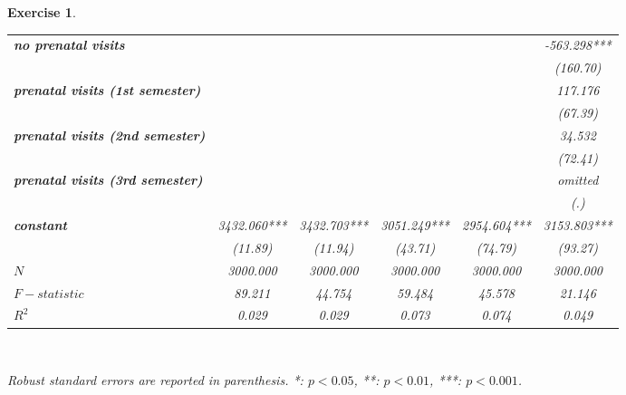 \documentclass{article}
\newtheorem{exercise}[theorem]{Exercise}
\begin{document}
\begin{exercise}
\begin{table}[hp!]
\begin{adjustbox}{width=1.2\textwidth}
\begin{tabular}{l|ccccc|}
\multicolumn{1}{|l|}{\textit{\textbf{no prenatal visits}}}             &             &             &             &             & -563.298***      \\
\multicolumn{1}{|l|}{\textit{\textbf{}}}                               &             &             &             &             & (160.70)         \\
\multicolumn{1}{|l|}{\textit{\textbf{prenatal visits (1st semester)}}} &             &             &             &             & 117.176          \\
\multicolumn{1}{|l|}{\textit{\textbf{}}}                               &             &             &             &             & (67.39)          \\
\multicolumn{1}{|l|}{\textit{\textbf{prenatal visits (2nd semester)}}} &             &             &             &             & 34.532           \\
\multicolumn{1}{|l|}{\textit{\textbf{}}}                               &             &             &             &             & (72.41)          \\
\multicolumn{1}{|l|}{\textit{\textbf{prenatal visits (3rd semester)}}} &             &             &             &             & \textit{omitted} \\
\multicolumn{1}{|l|}{\textit{\textbf{}}}                               &             &             &             &             & (.)              \\
\multicolumn{1}{|l|}{\textit{\textbf{constant}}}                       & 3432.060*** & 3432.703*** & 3051.249*** & 2954.604*** & 3153.803***      \\
\multicolumn{1}{|l|}{\textit{\textbf{}}}                               & (11.89)     & (11.94)     & (43.71)     & (74.79)     & (93.27)          \\ \hline
\multicolumn{1}{|l|}{\textit{\textbf{$N$}}}                              & 3000.000    & 3000.000    & 3000.000    & 3000.000    & 3000.000         \\
\multicolumn{1}{|l|}{\textit{\textbf{$F-statistic$}}}                    & 89.211      & 44.754      & 59.484      & 45.578      & 21.146           \\
\multicolumn{1}{|l|}{\textit{\textbf{$R^2$}}}           & 0.029       & 0.029       & 0.073       & 0.074       & 0.049            \\ \hline
\end{tabular}
\end{adjustbox}
\\[1em]
\begin{minipage}{\textwidth} %
\footnotesize{Robust standard errors are reported in parenthesis. *: $p<0.05$, **: $p<0.01$, ***: $p<0.001$.\par}
\end{minipage}
\end{table}

\end{exercise}
\end{document}

